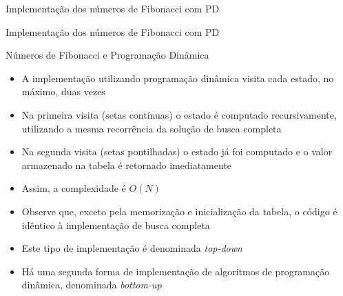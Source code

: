 \begin{frame}[fragile]{Implementação dos números de Fibonacci com PD}
\end{frame}

\begin{frame}[fragile]{Implementação dos números de Fibonacci com PD}
\end{frame}



\begin{frame}[fragile]{Números de Fibonacci e Programação Dinâmica}

    \begin{itemize}
        \item A implementação utilizando programação dinâmica visita cada estado, no máximo,
            duas vezes
        \pause

        \item Na primeira visita (setas contínuas) o estado é computado recursivamente, utilizando
            a mesma recorrência da solução de busca completa
        \pause

        \item Na segunda visita (setas pontilhadas) o estado já foi computado e o valor armazenado
            na tabela é retornado imediatamente
        \pause

        \item Assim, a complexidade é $O(N)$
        \pause

        \item Observe que, exceto pela memorização e inicialização da tabela, o código é idêntico
            à implementação de busca completa
        \pause

        \item Este tipo de implementação é denominada \textit{top-down}
        \pause

        \item Há uma segunda forma de implementação de algoritmos de programação dinâmica,
            denominada \textit{bottom-up}
    \end{itemize}

\end{frame}
